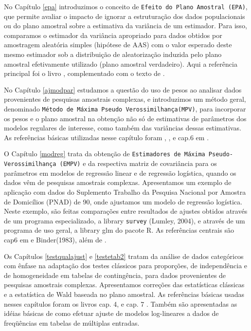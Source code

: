 \documentclass[]{book}
\numberwithin{example}{chapter}
\numberwithin{remark}{chapter}
\numberwithin{definition}{chapter}
\begin{document}
No Capítulo \ref{epa} introduzimos o conceito de
\texttt{Efeito\ do\ Plano\ Amostral\ (EPA)}, que permite avaliar o
impacto de ignorar a estruturação dos dados populacionais ou do plano
amostral sobre a estimativa da variância de um estimador. Para isso,
comparamos o estimador da variância apropriado para dados obtidos por
amostragem aleatória simples (hipótese de AAS) com o valor esperado
deste mesmo estimador sob a distribuição de aleatorização induzida pelo
plano amostral efetivamente utilizado (plano amostral verdadeiro). Aqui
a referência principal foi o livro \citep{SHS89}, complementado com o
texto de \citep{lethonen}.

No Capítulo \ref{ajmodpar} estudamos a questão do uso de pesos ao
analisar dados provenientes de pesquisas amostrais complexas, e
introduzimos um método geral, denominado
\texttt{Método\ de\ Máxima\ Pseudo\ Verossimilhança(MPV)}, para
incorporar os pesos e o plano amostral na obtenção não só de estimativas
de parâmetros dos modelos regulares de interesse, como também das
variâncias dessas estimativas. As referências básicas utilizadas nesse
capítulo foram \citep{SHS89}, \citep{Pfeff}, \citep{binder83} e cap.6 em
\citep{Silva}.

O Capítulo \ref{modreg} trata da obtenção de
\texttt{Estimadores\ de\ Máxima\ Pseudo-Verossimilhança\ (EMPV)} e da
respectiva matriz de covariância para os parâmetros em modelos de
regressão linear e de regressão logística, quando os dados vêm de
pesquisas amostrais complexas. Apresentamos um exemplo de aplicação com
dados do Suplemento Trabalho da Pesquisa Nacional por Amostra de
Domicílios (PNAD) de 90, onde ajustamos um modelo de regressão
logística. Neste exemplo, são feitas comparações entre resultados de
ajustes obtidos através de um programa especializado, a library
\texttt{survey} (Lumley, 2004), e através de um programa de uso geral, a
library glm do pacote R. As referências centrais são cap6 em
\citep{Silva} e Binder(1983), além de \citep{Pessoa}.

Os Capítulos \ref{testqualajust} e \ref{testetab2} tratam da análise de
dados categóricos com ênfase na adaptação dos testes clássicos para
proporções, de independência e de homogeneidade em tabelas de
contingência, para dados provenientes de pesquisas amostrais complexas.
Apresentamos correções das estatísticas clássicas e a estatística de
Wald baseada no plano amostral. As referências básicas usadas nesses
capítulos foram os livros cap. 4, \citep{SHS89} e cap. 7
\citep{lethonen}. Também são apresentadas as idéias básicas de como
efetuar ajuste de modelos log-lineares a dados de freqüências em tabelas
de múltiplas entradas.
\end{document}
